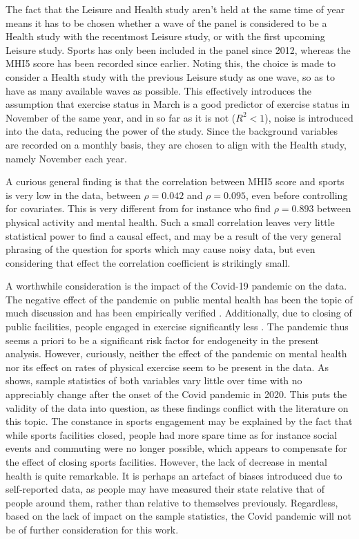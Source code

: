 The fact that the Leisure and Health study aren't held at the same time of year means it has to be chosen whether
a wave of the panel is considered to be a Health study with the recentmost Leisure study, or with the first upcoming
Leisure study.
Sports has only been included in the panel since 2012, whereas the MHI5 score has been recorded since earlier.
Noting this, the choice is made to consider a Health study with the previous Leisure study as one wave,
so as to have as many available waves as possible.
This effectively introduces the assumption that exercise status in March is a good predictor of exercise status
in November of the same year, and in so far as it is not ($R^2 < 1$),
noise is introduced into the data, reducing the power of the study.
Since the background variables are recorded on a monthly basis, they are chosen to align with the Health study,
namely November each year.

A curious general finding is that the correlation between MHI5 score and sports is very low in the data,
between $\rho = 0.042$ and $\rho = 0.095$, even before controlling for covariates.
This is very different from for instance  who find $\rho = 0.893$ between
physical activity and mental health.
Such a small correlation leaves very little statistical power to find a causal effect, and may be a result of
the very general phrasing of the question for sports which may cause noisy data, but even considering that effect
the correlation coefficient is strikingly small.

A worthwhile consideration is the impact of the Covid-19 pandemic on the data. The negative effect of the pandemic on public
mental health has been the topic of much discussion \cite{cullen2020mental,kumar2021covid} and has been empirically verified \cite{kupcova2023effects}.
Additionally, due to closing of public facilities, people engaged in exercise significantly less \cite{amini2021covid}.
The pandemic thus seems a priori to be a significant risk factor for endogeneity in the present analysis.
However, curiously, neither the effect of the pandemic on mental health nor its effect on rates of physical exercise
seem to be present in the data. As  shows, sample statistics of both variables
vary little over time with no appreciably change after the onset of the Covid pandemic in 2020.
This puts the validity of the data into question, as these findings conflict with the literature on this topic.
The constance in sports engagement may be explained by the fact that while sports facilities closed, people had more spare time
as for instance social events and commuting were no longer possible, which appears to compensate for the effect of
closing sports facilities.
However, the lack of decrease in mental health is quite remarkable. It is perhaps an artefact of biases introduced
due to self-reported data, as people may have measured their state relative that of people around them, rather than
relative to themselves previously.
Regardless, based on the lack of impact on the sample statistics, the Covid pandemic will not be of further consideration
for this work.

